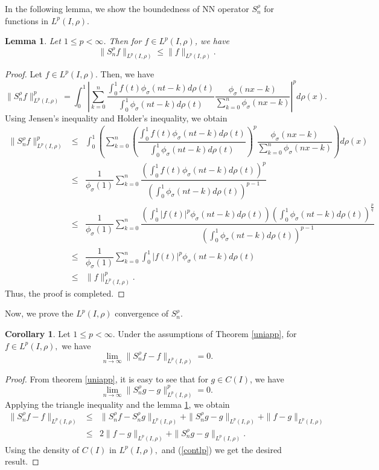 \documentclass[12pt, reqno]{amsart}
\numberwithin{equation}{section}
\newtheorem{lemma}[theorem]{Lemma}
\theoremstyle{definition}
\newtheorem{corollary}[theorem]{Corollary}
\theoremstyle{remark}
\numberwithin{equation}{section}
\newcommand{\Lp}{L^p(I, \rho)}
\begin{document}
In the following lemma, we show the boundedness of NN operator $S_n^\rho$ for functions in $\Lp.$
\begin{lemma} \label{uoplpboubd}
Let $1\leq p<\infty$. Then for $f\in \Lp$, we have
$$\|S^{\rho}_nf\|_{\Lp}\leq\|f\|_{\Lp}.$$
\end{lemma}

\begin{proof} 
Let $f\in\Lp$. Then, we have
\begin{equation*}
    \|S^{\rho}_nf\|^p_{\Lp}=\int_{0}^{1}\left|\sum_{k=0}^{n}\dfrac{\int_{0}^1f(t)\phi_\sigma(nt-k)d\rho(t)}{\int_{0}^1\phi_\sigma(nt-k)d\rho(t)} \dfrac{\phi_\sigma(nx-k)}{\sum_{k=0}^{n}\phi_\sigma(nx-k)}\right|^p d\rho(x). 
    \end{equation*}
Using Jensen's inequality and Holder's inequality, we obtain
\begin{eqnarray*}
\|S^{\rho}_nf\|^p_{\Lp} &\leq& \displaystyle{\int_{0}^1} \left(\displaystyle{\sum_{k=0}^n}\left(\dfrac{\int_0^1f(t)\phi_\sigma(nt-k)d\rho(t)}{\int_0^1\phi_\sigma(nt-k)d\rho(t)}\right)^p\dfrac{\phi_\sigma(nx-k)}{\sum_{k=0}^n\phi_\sigma(nx-k)}\right)d\rho(x) \\
&\leq& \dfrac{1}{\phi_\sigma(1)} \displaystyle{\sum_{k=0}^n}\dfrac{\left(\int_0^1f(t)\phi_\sigma(nt-k)d\rho(t)\right)^p}{\left(\int_0^1\phi_\sigma(nt-k)d\rho(t)\right)^{p-1}} \\
&\leq& \dfrac{1}{\phi_\sigma(1)} \displaystyle{\sum_{k=0}^n}\dfrac{\left(\int_0^1|f(t)|^p\phi_\sigma(nt-k)d\rho(t)\right)\left(\int_0^1\phi_\sigma(nt-k)d\rho(t)\right)^{\frac{p}{q}}}{\left(\int_0^1\phi_\sigma(nt-k)d\rho(t)\right)^{p-1}} \\
&\leq& \dfrac{1}{\phi_\sigma(1)} \displaystyle{\sum_{k=0}^n}\int_0^1|f(t)|^p\phi_\sigma(nt-k)d\rho(t) \\
&\leq& \|f\|_{\Lp}^p.     
\end{eqnarray*} 
Thus, the proof is completed. 
\end{proof} 

Now, we prove the $\Lp$ convergence of $S^{\rho}_n.$
 \begin{corollary} \label{oplpcon}
    Let $1\leq p<\infty.$ Under the assumptions of Theorem \ref{uniapp}, for $f\in \Lp,$ we have
$$\lim_{n\to\infty}\|S^{\rho}_nf-f\|_{\Lp}=0.$$
\end{corollary}
\begin{proof}

From theorem \ref{uniapp}, it is easy to see that for $g\in C(I)$, we have \begin{equation}
    \lim_{n\to \infty}\|S^{\rho}_ng-g\|^p_{\Lp}=0.\label{contlp}
\end{equation}
Applying the triangle inequality and the lemma \ref{uoplpboubd}, we obtain 
   \begin{eqnarray*}
    \|S^{\rho}_nf-f\|_{\Lp} 
    &\leq&  \|S^{\rho}_nf-S^{\rho}_ng\|_{\Lp}+ \|S^{\rho}_ng-g\|_{\Lp} + \|f-g\|_{\Lp}\\
    &\leq& 2\|f-g\|_{\Lp} + \|S^{\rho}_ng-g\|_{\Lp}.
   \end{eqnarray*}
 Using the density of $C(I)$ in $\Lp,$ and (\ref{contlp}) we get the desired result.
\end{proof}
     
\end{document}

